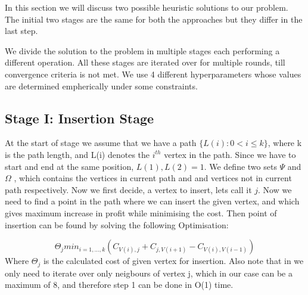 \documentclass{article}
\begin{document}
In this section we will discuss two possible heuristic solutions to our problem. The initial two stages 
are the same for both the approaches but they differ in the last step.




We divide the solution to the problem in multiple stages each performing a different operation. All these stages are iterated over for multiple rounds, till convergence criteria is not met.
We use 4 different hyperparameters whose values are determined empherically under some constraints.

\subsection{Stage I: Insertion Stage}

At the start of stage we assume that we have a path $\{L(i) : 0<i \leq k\}$, where k is the path length, and L(i) denotes the $i^{th}$ vertex in the path.
Since we have to start and end at the same position,
$L(1),L(2) = 1$.
We define two sets $\Psi$ and $\Omega$
, which contains the vertices in current path and and vertices not in current path respectively.
Now we first decide, a vertex to insert, lets call it $j$. Now we need to find a point in the path where we can insert the given vertex, and which gives maximum increase in profit while minimising the cost.
Then point of insertion can be found by solving the following Optimisation:

\begin{equation} \label{eq2}
    \Theta_{j} min_{i = 1,\dots,k} ( C_{V(i),j} + C_{j,V(i+1)} - C_{V(i),V(i-1)} )
\end{equation}
Where $\Theta_{j}$ is the calculated cost of given vertex for insertion.
Also note that in  we only need to iterate over only neigbours of vertex j, which in our case can be a maximum of 8, and therefore step 1 can be done in O(1) time.
\end{document}
